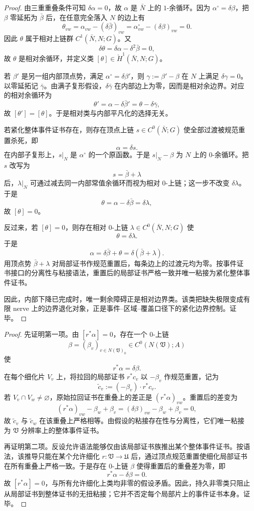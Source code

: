 \begin{proof}
由三重重叠条件可知 \(\delta\alpha=0\)，故 \(\alpha\) 是 \(\bar N\) 上的 \(1\)-余循环。因为 \(\alpha^\circ=\delta\beta\)，把 \(\beta\) 零延拓为 \(\bar\beta\) 后，在任意完全落入 \(N\) 的边上有
\[
\theta_{vw}=\alpha_{vw}-(\delta\bar\beta)_{vw}=\alpha^\circ_{vw}-(\delta\beta)_{vw}=0.
\]
因此 \(\theta\) 属于相对上链群 \(C^1(\bar N,N;G)\)。又
\[
\delta\theta=\delta\alpha-\delta^2\bar\beta=0,
\]
故 \(\theta\) 是相对余循环，并定义类 \([\theta]\in \check H^1(\bar N,N;G)\)。

若 \(\beta'\) 是另一组内部顶点势，满足 \(\alpha^\circ=\delta\beta'\)，则 \(\gamma:=\beta'-\beta\) 在 \(N\) 上满足 \(\delta\gamma=0\)。以零延拓记 \(\bar\gamma\)。由满子复形假设，\(\delta\bar\gamma\) 在内部边上为零，因而是相对余边界。对应的相对余循环为
\[
\theta'=\alpha-\delta\bar\beta'=\theta-\delta\bar\gamma,
\]
故 \([\theta']=[\theta]\)。于是相对类与内部平凡化的选择无关。

若紧化整体事件证书存在，则存在顶点上链 \(s\in C^0(\bar N;G)\) 使全部过渡被规范重置杀死，即
\[
\alpha=\delta s.
\]
在内部子复形上，\(s|_N\) 是 \(\alpha^\circ\) 的一个原函数。于是 \(s|_N-\beta\) 为 \(N\) 上的 \(0\)-余循环。把 \(s\) 改写为
\[
s=\bar\beta+\lambda
\]
后，\(\lambda|_N\) 可通过减去同一内部常值余循环而视为相对 \(0\)-上链；这一步不改变 \(\delta\lambda\)。于是
\[
\theta=\alpha-\delta\bar\beta=\delta\lambda,
\]
故 \([\theta]=0\)。

反过来，若 \([\theta]=0\)，则存在相对 \(0\)-上链 \(\lambda\in C^0(\bar N,N;G)\) 使
\[
\theta=\delta\lambda.
\]
于是
\[
\alpha=\delta\bar\beta+\theta=\delta(\bar\beta+\lambda).
\]
用顶点势 \(\bar\beta+\lambda\) 对局部证书作规范重置后，每条边上的过渡元均为零。按事件证书接口的分离性与粘接语法，重置后的局部证书严格一致并唯一粘接为紧化整体事件证书。

因此，内部下降已完成时，唯一剩余障碍正是相对边界类。该类把缺失极限变成有限 nerve 上的边界退化对象，正是事件--区域--覆盖口径下的紧化边界控制。证毕。
\end{proof}


\begin{proof}
先证明第一项。由 \([r^\ast\alpha]=0\)，存在一个 \(0\)-上链
\[
\beta=(\beta_v)_{v\in N(\mathfrak V)_0}\in C^0(N(\mathfrak V);A)
\]
使
\[
r^\ast\alpha=\delta\beta .
\]
在每个细化片 \(V_v\) 上，将拉回的局部证书 \(r^\ast c_v\) 以 \(-\beta_v\) 作规范重置，记为
\[
\widetilde c_v:=(-\beta_v)\cdot r^\ast c_v .
\]
若 \(V_v\cap V_w\ne\varnothing\)，原始拉回证书在重叠上的差正是 \((r^\ast\alpha)_{vw}\)。重置后的差变为
\[
(r^\ast\alpha)_{vw}-\beta_w+\beta_v
=(\delta\beta)_{vw}-\beta_w+\beta_v=0,
\]
故 \(\widetilde c_v\) 与 \(\widetilde c_w\) 在该重叠上严格相等。由假设的粘接存在性与分离性，它们唯一粘接为 \(\mathfrak V\) 分辨率上的整体事件证书。

再证明第二项。反设允许语法能够仅由该局部证书族推出某个整体事件证书。按语法，该推导只能在某个允许细化 \(r:\mathfrak V\to\mathfrak U\) 后，通过顶点规范重置使细化局部证书在所有重叠上严格一致。于是存在 \(0\)-上链 \(\beta\) 使得重置后的重叠差为零，即
\[
r^\ast\alpha-\delta\beta=0.
\]
故 \([r^\ast\alpha]=0\)，与所有允许细化上类均非零的假设矛盾。因此，持久非零类只阻止从局部证书到整体证书的无扭粘接；它并不否定每个局部片上的事件证书本身。证毕。
\end{proof}

